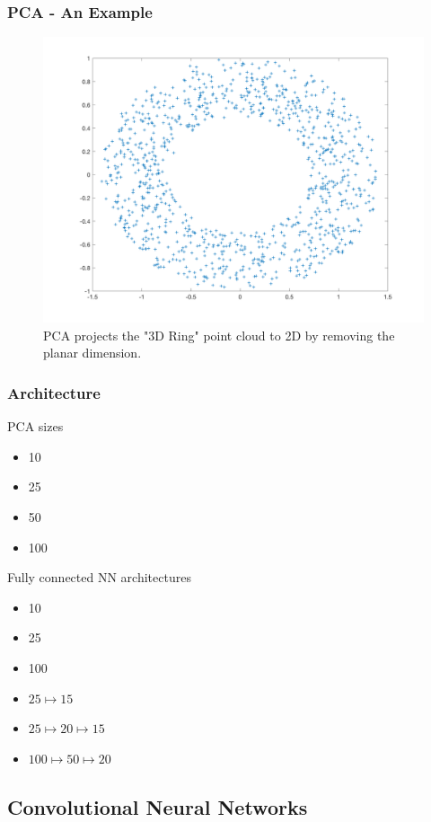 \documentclass{beamer}
\begin{document}
\begin{frame}
\frametitle{PCA - An Example}
	\begin{figure}[hbt]
\includegraphics[width=1\textwidth,height=0.7\textheight,keepaspectratio]{ring_pca}
  	\caption{\footnotesize{PCA projects the "3D Ring" point cloud to 2D by removing the planar dimension.}}
	\end{figure}
\end{frame}


\begin{frame}
\frametitle{Architecture}
	\vspace{1em}
	PCA sizes \\
	\begin{itemize}
		\item 10
		\item 25
		\item 50
		\item 100
	\end{itemize}
	Fully connected NN architectures\\
	\begin{itemize}
		\item 10
		\item 25
		\item 100
		\item $25 \longmapsto 15$
		\item $25 \longmapsto 20 \longmapsto 15$
		\item $100 \longmapsto 50 \longmapsto 20$
	\end{itemize}
\end{frame}

\subsection{Convolutional Neural Networks}
\end{document}
